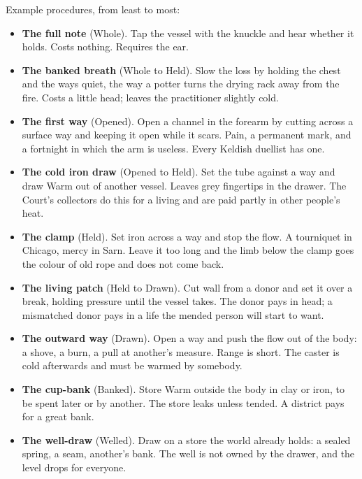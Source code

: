\documentclass{design/chronicle}
\begin{document}
Example procedures, from least to most:

\begin{itemize}[leftmargin=1.4em,itemsep=1pt,topsep=3pt,parsep=0pt]

\item \textbf{The full note} (Whole). Tap the vessel with the knuckle and hear whether it holds. Costs nothing. Requires the ear.

\item \textbf{The banked breath} (Whole to Held). Slow the loss by holding the chest and the ways quiet, the way a potter turns the drying rack away from the fire. Costs a little head; leaves the practitioner slightly cold.

\item \textbf{The first way} (Opened). Open a channel in the forearm by cutting across a surface way and keeping it open while it scars. Pain, a permanent mark, and a fortnight in which the arm is useless. Every Keldish duellist has one.

\item \textbf{The cold iron draw} (Opened to Held). Set the tube against a way and draw Warm out of another vessel. Leaves grey fingertips in the drawer. The Court’s collectors do this for a living and are paid partly in other people’s heat.

\item \textbf{The clamp} (Held). Set iron across a way and stop the flow. A tourniquet in Chicago, mercy in Sarn. Leave it too long and the limb below the clamp goes the colour of old rope and does not come back.

\item \textbf{The living patch} (Held to Drawn). Cut wall from a donor and set it over a break, holding pressure until the vessel takes. The donor pays in head; a mismatched donor pays in a life the mended person will start to want.

\item \textbf{The outward way} (Drawn). Open a way and push the flow out of the body: a shove, a burn, a pull at another’s measure. Range is short. The caster is cold afterwards and must be warmed by somebody.

\item \textbf{The cup-bank} (Banked). Store Warm outside the body in clay or iron, to be spent later or by another. The store leaks unless tended. A district pays for a great bank.

\item \textbf{The well-draw} (Welled). Draw on a store the world already holds: a sealed spring, a seam, another’s bank. The well is not owned by the drawer, and the level drops for everyone.


\end{itemize}
\end{document}

